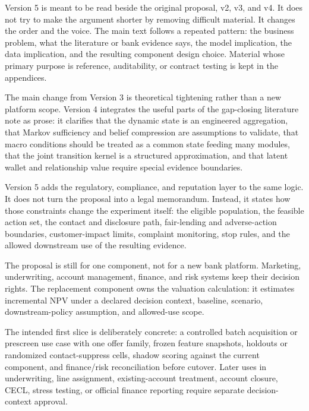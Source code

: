 \documentclass[11pt]{article}
\newcommand{\1}{\mathbf{1}}
\begin{document}
Version 5 is meant to be read beside the original proposal, v2, v3, and v4. It does not
try to make the argument shorter by removing difficult material. It changes the
order and the voice. The main text follows a repeated pattern: the business
problem, what the literature or bank evidence says, the model implication, the
data implication, and the resulting component design choice. Material whose
primary purpose is reference, auditability, or contract testing is kept in the
appendices.

The main change from Version 3 is theoretical tightening rather than a new
platform scope. Version 4 integrates the useful parts of the gap-closing
literature note as prose: it clarifies that the dynamic state is an engineered
aggregation, that Markov sufficiency and belief compression are assumptions to
validate, that macro conditions should be treated as a common state feeding many
modules, that the joint transition kernel is a structured approximation, and
that latent wallet and relationship value require special evidence boundaries.

Version 5 adds the regulatory, compliance, and reputation layer to the same
logic. It does not turn the proposal into a legal memorandum. Instead, it
states how those constraints change the experiment itself: the eligible
population, the feasible action set, the contact and disclosure path,
fair-lending and adverse-action boundaries, customer-impact limits, complaint
monitoring, stop rules, and the allowed downstream use of the resulting
evidence.

The proposal is still for one component, not for a new bank platform.  Marketing,
underwriting, account management, finance, and risk systems keep their decision
rights.  The replacement component owns the valuation calculation: it estimates
incremental NPV under a declared decision context, baseline, scenario,
downstream-policy assumption, and allowed-use scope.

The intended first slice is deliberately concrete: a controlled batch
acquisition or prescreen use case with one offer family, frozen feature
snapshots, holdouts or randomized contact-suppress cells, shadow scoring against
the current component, and finance/risk reconciliation before cutover. Later
uses in underwriting, line assignment, existing-account treatment, account
closure, CECL, stress testing, or official finance reporting require separate
decision-context approval.

\tableofcontents
\clearpage
\end{document}
